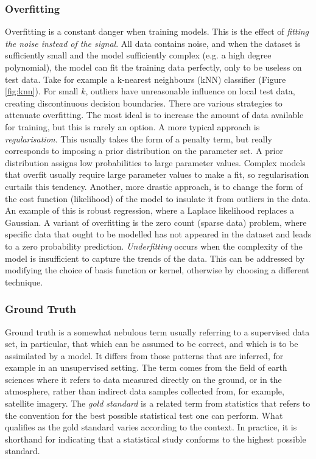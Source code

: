 \documentclass[11pt]{amsart}
\begin{document}
\subsubsection{Overfitting} Overfitting is a constant danger when training models. This is the effect of \emph{fitting the noise instead of the signal}. All data contains noise, and when the dataset is sufficiently small and the model sufficiently complex (e.g. a high degree polynomial), the model can fit the training data perfectly, only to be useless on test data. Take for example a k-nearest neighbours (kNN) classifier (Figure \ref{fig:knn}). For small $k$, outliers have unreasonable influence on local test data, creating discontinuous decision boundaries. There are various strategies to attenuate overfitting. The most ideal is to increase the amount of data available for training, but this is rarely an option. A more typical approach is \emph{regularisation}. This usually takes the form of a penalty term, but really corresponds to imposing a prior distribution on the parameter set. A prior distribution assigns low probabilities to large parameter values. Complex models that overfit usually require large parameter values to make a fit, so regularisation curtails this tendency. Another, more drastic approach, is to change the form of the cost function (likelihood) of the model to insulate it from outliers in the data. An example of this is robust regression, where a Laplace likelihood replaces a Gaussian. A variant of overfitting is the zero count (sparse data) problem, where specific data that ought to be modelled has not appeared in the dataset and leads to a zero probability prediction. \emph{Underfitting} occurs when the complexity of the model is insufficient to capture the trends of the data. This can be addressed by modifying the choice of basis function or kernel, otherwise by choosing a different technique.

\subsubsection{Ground Truth}
Ground truth is a somewhat nebulous term usually referring to a supervised data set, in particular, that which can be assumed to be correct, and which is to be assimilated by a model. It differs from those patterns that are inferred, for example in an unsupervised setting. The term comes from the field of earth sciences where it refers to data measured directly on the ground, or in the atmosphere, rather than indirect data samples collected from, for example, satellite imagery. The \emph{gold standard} is a related term from statistics that refers to the convention for the best possible statistical test one can perform. What qualifies as the gold standard varies according to the context. In practice, it is shorthand for indicating that a statistical study conforms to the highest possible standard.
\end{document}
